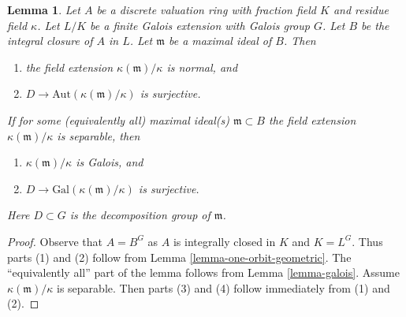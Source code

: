 \documentclass[10pt,a4paper]{amsart}
\theoremstyle{plain}
\newtheorem{lemma}[subsection]{Lemma}
\theoremstyle{definition}
\theoremstyle{remark}
\numberwithin{equation}{subsection}
\begin{document}
\begin{lemma}
\label{lemma-galois-galois}
Let $A$ be a discrete valuation ring with fraction field $K$ and residue field
$\kappa$. Let $L/K$ be a finite Galois extension with Galois group $G$.
Let $B$ be the integral closure of $A$ in $L$. Let $\mathfrak m$ be a maximal
ideal of $B$. Then
\begin{enumerate}
\item the field extension $\kappa(\mathfrak m)/\kappa$ is normal, and
\item $D \to \text{Aut}(\kappa(\mathfrak m)/\kappa)$ is surjective.
\end{enumerate}
If for some (equivalently all) maximal ideal(s) $\mathfrak m \subset B$
the field extension $\kappa(\mathfrak m)/\kappa$ is separable, then
\begin{enumerate}
\item[(3)] $\kappa(\mathfrak m)/\kappa$ is Galois, and
\item[(4)] $D \to \text{Gal}(\kappa(\mathfrak m)/\kappa)$ is surjective.
\end{enumerate}
Here $D \subset G$ is the decomposition group of $\mathfrak m$.
\end{lemma}

\begin{proof}
Observe that $A = B^G$ as $A$ is integrally closed in $K$ and $K = L^G$.
Thus parts (1) and (2) follow from Lemma \ref{lemma-one-orbit-geometric}.
The ``equivalently all'' part of the lemma follows from
Lemma \ref{lemma-galois}. Assume $\kappa(\mathfrak m)/\kappa$
is separable. Then parts (3) and (4) follow immediately from (1) and (2).
\end{proof}
\end{document}

